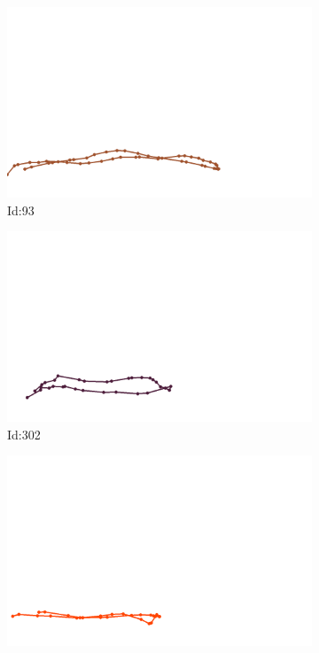 \documentclass[12pt,twoside]{report}
\begin{document}
\begin{figure}
\centering
\begin{subfigure}[b]{0.20\textwidth}
\centering
\includegraphics[width=\textwidth]{../../trajectories/93.png}
\caption{Id:93}
\end{subfigure}
\begin{subfigure}[b]{0.20\textwidth}
\centering
\includegraphics[width=\textwidth]{../../trajectories/302.png}
\caption{Id:302}
\end{subfigure}
\begin{subfigure}[b]{0.20\textwidth}
\centering
\includegraphics[width=\textwidth]{../../trajectories/377.png}

\end{subfigure}
\end{figure}
\end{document}
